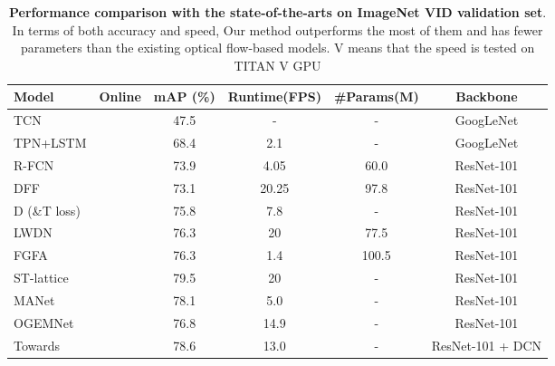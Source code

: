 \documentclass[runningheads]{llncs}
\newcommand{\cmark}{\ding{51}}\newcommand{\xmark}{\ding{55}}
\begin{document}
\begin{table}[t]\centering
\caption{
\textbf{Performance comparison with the state-of-the-arts on ImageNet VID validation set}. 
In terms of both accuracy and speed, 
Our method outperforms the most of them and has fewer parameters than the existing optical flow-based models. V means that the speed is tested on TITAN V GPU
}
\begin{tabular}{lccccc}
\toprule
Model   & Online &  mAP (\%) & Runtime(FPS)  & \#Params(M)  & Backbone \\
\midrule
TCN\cite{kang2016object}                                        &     \xmark       & 47.5             & -                  &-   &  GoogLeNet                          \\
TPN+LSTM\cite{kang2017object}                                          &     \xmark       & 68.4             & 2.1                &-     &  GoogLeNet                 \\
R-FCN \cite{dai2016r}                                             &     \cmark       & 73.9             & 4.05                &60.0 & ResNet-101             \\
DFF \cite{zhu2017deep}                                             &     \cmark       & 73.1             & 20.25               &97.8   & ResNet-101           \\
D (\&T loss) \cite{feichtenhofer2017detect}                          &     \cmark & 75.8             & 7.8                &-     & ResNet-101          \\
LWDN \cite{Jiang2019VideoOD}                                     & \cmark        & 76.3             & 20                &77.5    & ResNet-101    \\
FGFA \cite{zhu2017flow}                                            &     \xmark  & 76.3             & 1.4                &100.5  & ResNet-101           \\
ST-lattice \cite{chen2018optimizing}                               &     \xmark  & 79.5             & 20                  &-    & ResNet-101             \\
MANet\cite{wang2018fully}                                          &     \xmark  & 78.1             & 5.0                &-      & ResNet-101           \\
OGEMNet\cite{deng2019object}                                      &     \cmark & 76.8         & 14.9               &-       & ResNet-101            \\
Towards \cite{zhu2018towards}                  &     \cmark  & 78.6             & 13.0               &-       & ResNet-101 + DCN      \\

\end{tabular}
\end{table}
\end{document}
